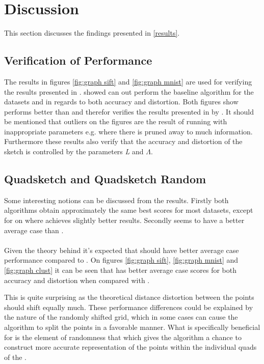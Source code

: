 \section{Discussion}
\label{discussion}
This section discusses the findings presented in \ref{results}.

\subsection{Verification of Performance}
The results in figures \ref{fig:graph sift} and \ref{fig:graph mnist} are used for verifying the results presented in \cite{wagner17}. \cite{wagner17} showed \qs{} can out perform the baseline algorithm \grid{} for the datasets \sift{} and \mnist{} in regards to both accuracy and distortion. Both figures show \qs{} performs better than \grid{} and therefor verifies the results presented in by \cite{wagner17}. It should be mentioned that outliers on the figures are the result of running \qs{} with inappropriate parameters e.g. where there is pruned away to much information. Furthermore these results also verify that the accuracy and distortion of the sketch is controlled by the parameters \textit{L} and $\Lambda$.  

\subsection{Quadsketch and Quadsketch Random}
Some interesting notions can be discussed from the results. Firstly both algorithms obtain approximately the same best scores for most datasets, except for on \mnist{} where \qsr{} achieves slightly better results. 
Secondly \qsr{} seems to have a better average case than \qs{}. 
\\
\\
Given the theory behind \qsr{} it's expected that \qsr{} should have better average case performance compared to \qs{}. On figures \ref{fig:graph sift}, \ref{fig:graph mnist} and \ref{fig:graph clust} it can be seen that \qsr{} has better average case scores for both accuracy and distortion when compared with \qs{}.



This is quite surprising as the theoretical distance distortion between the points should shift equally much. These performance differences could be explained by the nature of the randomly shifted grid, which in some cases can cause the algorithm to split the points in a favorable manner. What is  specifically beneficial for \qsr{} is the element of randomness that which gives the algorithm a chance to construct more accurate representation of the points within the individual quads of the \qt{}.


